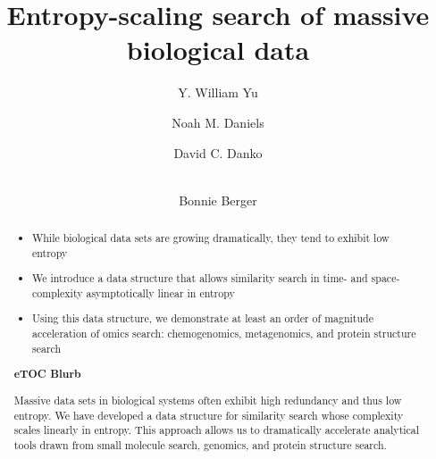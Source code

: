 \documentclass[review,preprint,12pt]{elsarticle}
\theoremstyle{definition}
\theoremstyle{remark}
\numberwithin{equation}{section}
\begin{document}
\begin{frontmatter}

\title{ %
Entropy-scaling search of massive biological data}

\author[mitmath,mitcsail]{Y. William Yu}
\author[mitmath,mitcsail]{Noah M. Daniels}
\author[mitcsail]{David C. Danko}
\author[mitmath,mitcsail]{\\Bonnie Berger}
\address[mitmath]{Department of Mathematics, Massachusetts Institute of Technology, Cambridge, Massachusetts 02139}
\address[mitcsail]{Computer Science and AI Lab, Massachusetts Institute of Technology, Cambridge, Massachusetts 02139}






\begin{abstract}
    \begin{itemize}
        \item While biological data sets are growing dramatically, they tend to exhibit low entropy
        \item We introduce a data structure that allows similarity search in time- and space-complexity asymptotically linear in entropy
        \item Using this data structure, we demonstrate at least an order of magnitude acceleration of omics search: chemogenomics, metagenomics, and protein structure search
    \end{itemize}
\noindent\unskip\textbf{eTOC Blurb}
\par\medskip\noindent\unskip\ignorespaces
Massive data sets in biological systems often exhibit high redundancy and thus low entropy.
We have developed a data structure for similarity search whose complexity scales linearly in entropy.
This approach allows us to dramatically accelerate analytical tools drawn from small molecule search, genomics, and protein structure search.
\end{abstract}

\end{frontmatter}
\end{document}
